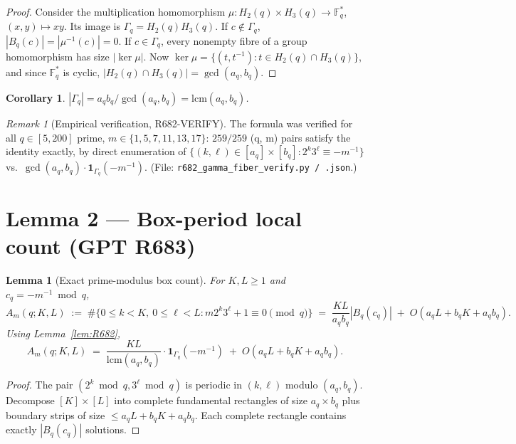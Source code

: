 \documentclass[12pt]{amsart}
\newtheorem{lemma}{Lemma}
\newtheorem{corollary}{Corollary}
\theoremstyle{definition}
\theoremstyle{remark}
\newtheorem{remark}{Remark}
\begin{document}
\begin{proof}
Consider the multiplication homomorphism $\mu : H_2(q) \times H_3(q) \to \mathbb{F}_q^*$,
$(x, y) \mapsto xy$. Its image is $\Gamma_q = H_2(q) H_3(q)$. If $c \notin \Gamma_q$,
$|B_q(c)| = |\mu^{-1}(c)| = 0$. If $c \in \Gamma_q$, every nonempty fibre of a group
homomorphism has size $|\ker \mu|$. Now
$\ker \mu = \{(t, t^{-1}) : t \in H_2(q) \cap H_3(q)\}$, and since $\mathbb{F}_q^*$ is
cyclic, $|H_2(q) \cap H_3(q)| = \gcd(a_q, b_q)$.
\end{proof}

\begin{corollary}\label{cor:Gamma-size}
$|\Gamma_q| = a_q b_q / \gcd(a_q, b_q) = \mathrm{lcm}(a_q, b_q)$.
\end{corollary}

\begin{remark}[Empirical verification, R682-VERIFY]
The formula was verified for all $q \in [5, 200]$ prime, $m \in \{1, 5, 7, 11, 13, 17\}$:
$259/259$ (q, m) pairs satisfy the identity exactly, by direct enumeration of
$\{(k, \ell) \in [a_q] \times [b_q] : 2^k 3^\ell \equiv -m^{-1}\}$ vs.\
$\gcd(a_q, b_q) \cdot \mathbf{1}_{\Gamma_q}(-m^{-1})$.
\hfill(File: \texttt{r682\_gamma\_fiber\_verify.py / .json}.)
\end{remark}

\section{Lemma 2 --- Box-period local count (GPT R683)}

\begin{lemma}[Exact prime-modulus box count]\label{lem:R683}
For $K, L \ge 1$ and $c_q = -m^{-1} \bmod q$,
$$
A_m(q; K, L)
\;:=\;
\# \{0 \le k < K,\ 0 \le \ell < L : m 2^k 3^\ell + 1 \equiv 0 \pmod q\}
\;=\;
\frac{KL}{a_q b_q} |B_q(c_q)|
\;+\;
O(a_q L + b_q K + a_q b_q).
$$
Using Lemma~\ref{lem:R682},
$$
A_m(q; K, L)
\;=\;
\frac{KL}{\mathrm{lcm}(a_q, b_q)} \cdot \mathbf{1}_{\Gamma_q}(-m^{-1})
\;+\;
O(a_q L + b_q K + a_q b_q).
$$
\end{lemma}

\begin{proof}
The pair $(2^k \bmod q, 3^\ell \bmod q)$ is periodic in $(k, \ell)$ modulo $(a_q, b_q)$.
Decompose $[K] \times [L]$ into complete fundamental rectangles of size $a_q \times b_q$
plus boundary strips of size $\le a_q L + b_q K + a_q b_q$.
Each complete rectangle contains exactly $|B_q(c_q)|$ solutions.
\end{proof}
\end{document}

